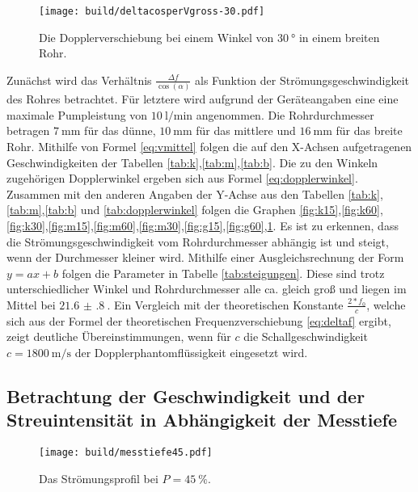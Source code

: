 \begin{figure}
 \centering
 \caption{Die Dopplerverschiebung bei einem Winkel von $\SI{30}{\degree}$ in einem breiten Rohr.}
 \texttt{[image: build/deltacosperVgross-30.pdf]}
 \label{fig:g30}
\end{figure}

Zunächst wird das Verhältnis $\frac{\Delta f}{\cos(\alpha)}$ als Funktion der
Strömungsgeschwindigkeit des Rohres betrachtet. Für letztere wird aufgrund der Geräteangaben eine eine maximale
Pumpleistung von $\SI{10}{\litre\per\minute}$ angenommen. Die Rohrdurchmesser betragen
$\SI{7}{\milli\meter}$ für das dünne, $\SI{10}{\milli\meter}$ für das mittlere und
$\SI{16}{\milli\meter}$ für das breite Rohr. Mithilfe von
Formel \ref{eq:vmittel} folgen die auf den X-Achsen aufgetragenen Geschwindigkeiten der Tabellen \ref{tab:k},\ref{tab:m},\ref{tab:b}.
Die zu den Winkeln zugehörigen Dopplerwinkel ergeben sich aus Formel \ref{eq:dopplerwinkel}.
Zusammen mit den anderen Angaben der Y-Achse aus den Tabellen \ref{tab:k},\ref{tab:m},\ref{tab:b} und \ref{tab:dopplerwinkel} folgen die Graphen
\ref{fig:k15},\ref{fig:k60},\ref{fig:k30},\ref{fig:m15},\ref{fig:m60},\ref{fig:m30},\ref{fig:g15},\ref{fig:g60},\ref{fig:g30}.
Es ist zu erkennen, dass die Strömungsgeschwindigkeit vom Rohrdurchmesser abhängig
ist und steigt, wenn der Durchmesser kleiner wird. Mithilfe einer Ausgleichsrechnung
der Form $y=ax+b$ folgen die Parameter in Tabelle \ref{tab:steigungen}. Diese
sind trotz unterschiedlicher Winkel und Rohrdurchmesser alle ca. gleich groß und
liegen im Mittel bei $\SI{21.6(8)}{}$. Ein Vergleich mit der theoretischen
Konstante $\frac{2*f_0}{c}$, welche sich aus der Formel der theoretischen
Frequenzverschiebung \ref{eq:deltaf} ergibt, zeigt deutliche Übereinstimmungen, wenn für $c$
die Schallgeschwindigkeit $c = \SI{1800}{\meter\per\second}$ der Dopplerphantomflüssigkeit
eingesetzt wird.



\subsection{Betrachtung der Geschwindigkeit und der Streuintensität in Abhängigkeit der Messtiefe}

\begin{figure}
 \centering
 \caption{Das Strömungsprofil bei $P = \SI{45}{\percent}$.}
 \texttt{[image: build/messtiefe45.pdf]}
 \label{fig:P45}
\end{figure}

